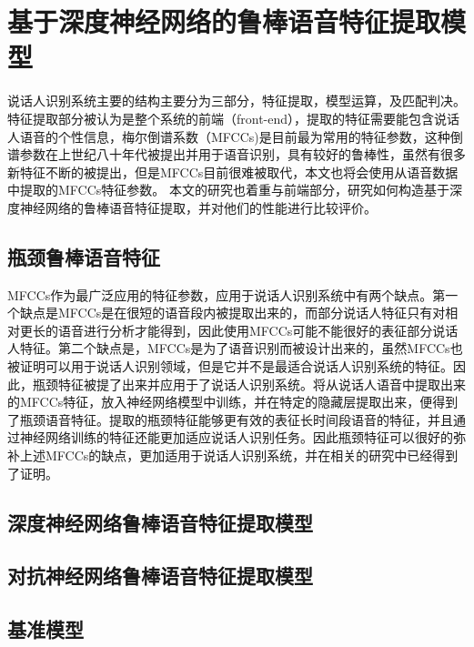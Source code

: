 \documentclass[a4paper,oneside,12pt]{book}
\begin{document}


\chapter{基于深度神经网络的鲁棒语音特征提取模型}

说话人识别系统主要的结构主要分为三部分，特征提取，模型运算，及匹配判决。特征提取部分被认为是整个系统的前端（front-end），提取的特征需要能包含说话人语音的个性信息，梅尔倒谱系数（MFCCs)\cite{davis1990comparison}是目前最为常用的特征参数，这种倒谱参数在上世纪八十年代被提出并用于语音识别，具有较好的鲁棒性，虽然有很多新特征不断的被提出，但是MFCCs目前很难被取代，本文也将会使用从语音数据中提取的MFCCs特征参数。 本文的研究也着重与前端部分，研究如何构造基于深度神经网络的鲁棒语音特征提取，并对他们的性能进行比较评价。

\section{瓶颈鲁棒语音特征}

MFCCs作为最广泛应用的特征参数，应用于说话人识别系统中有两个缺点。第一个缺点是MFCCs是在很短的语音段内被提取出来的，而部分说话人特征只有对相对更长的语音进行分析才能得到，因此使用MFCCs可能不能很好的表征部分说话人特征。第二个缺点是，MFCCs是为了语音识别而被设计出来的，虽然MFCCs也被证明可以用于说话人识别领域，但是它并不是最适合说话人识别系统的特征。因此，瓶颈特征被提了出来并应用于了说话人识别系统\cite{fu2014tandem}。将从说话人语音中提取出来的MFCCs特征，放入神经网络模型中训练，并在特定的隐藏层提取出来，便得到了瓶颈语音特征。提取的瓶颈特征能够更有效的表征长时间段语音的特征，并且通过神经网络训练的特征还能更加适应说话人识别任务。因此瓶颈特征可以很好的弥补上述MFCCs的缺点，更加适用于说话人识别系统，并在相关的研究中已经得到了证明\cite{liu2015deep}。

\section{深度神经网络鲁棒语音特征提取模型}

\section{对抗神经网络鲁棒语音特征提取模型}

\section{基准模型}
\end{document}
